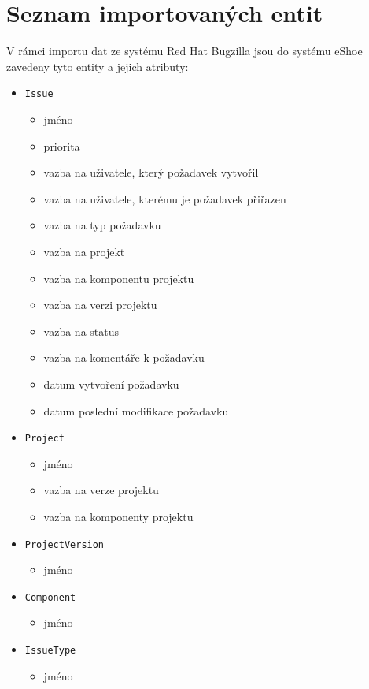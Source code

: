 \documentclass[11pt,oneside]{fithesis2}
\begin{document}
\endgroup

\appendix
\chapter{Seznam importovaných entit}
\label{PrilohaSeznamEntit}
V rámci importu dat ze systému Red Hat Bugzilla jsou do systému eShoe zavedeny tyto entity a jejich atributy:
\begin{itemize}
	\item \texttt{Issue}
		\begin{itemize}
			\item jméno
			\item priorita
			\item vazba na uživatele, který požadavek vytvořil
			\item vazba na uživatele, kterému je požadavek přiřazen
			\item vazba na typ požadavku
			\item vazba na projekt
			\item vazba na komponentu projektu
			\item vazba na verzi projektu
			\item vazba na status
			\item vazba na komentáře k požadavku
			\item datum vytvoření požadavku
			\item datum poslední modifikace požadavku
		\end{itemize}
	\item \texttt{Project}
		\begin{itemize}
			\item jméno
			\item vazba na verze projektu
			\item vazba na komponenty projektu			
		\end{itemize}
	\item \texttt{ProjectVersion}
		\begin{itemize}
			\item jméno				
		\end{itemize}
	\item \texttt{Component}
		\begin{itemize}
			\item jméno
		\end{itemize}
	\item \texttt{IssueType}
		\begin{itemize}
			\item jméno

\end{itemize}
\end{itemize}
\end{document}
